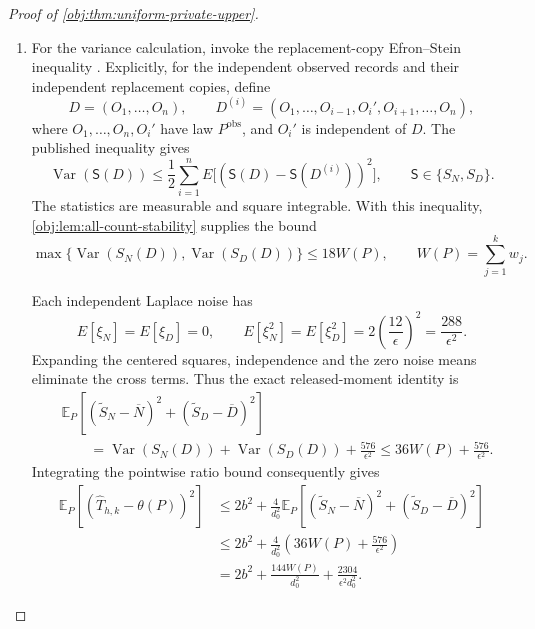 \begin{proof}[Proof of \cref{obj:thm:uniform-private-upper}]
\begin{enumerate}
\item
For the variance calculation, invoke the replacement-copy Efron--Stein inequality \citep[Theorem~3.1, replacement-copy form, p.~54]{BoucheronLugosiMassart2013}. Explicitly, for the independent observed records and their independent replacement copies, define
\[
D=(O_1,\ldots,O_n),
\qquad
D^{(i)}=(O_1,\ldots,O_{i-1},O_i',O_{i+1},\ldots,O_n),
\]
where \(O_1,\ldots,O_n,O_i'\) have law \(P^{\mathrm{obs}}\), and \(O_i'\) is independent of \(D\). The published inequality gives
\[
\operatorname{Var}(\mathsf S(D))
\le
\frac12\sum_{i=1}^n
E\bigl[(\mathsf S(D)-\mathsf S(D^{(i)}))^2\bigr],
\qquad
\mathsf S\in\{S_N,S_D\}.
\]
The statistics are measurable and square integrable. With this inequality, \cref{obj:lem:all-count-stability} supplies the bound
\[
\max\{\operatorname{Var}(S_N(D)),\operatorname{Var}(S_D(D))\}
\le18W(P),
\qquad
W(P)=\sum_{j=1}^k w_j.
\]

Each independent Laplace noise has
\[
E[\xi_N]=E[\xi_D]=0,
\qquad
E[\xi_N^2]=E[\xi_D^2]
=2\left(\frac{12}{\epsilon}\right)^2
=\frac{288}{\epsilon^2}.
\]
Expanding the centered squares, independence and the zero noise means eliminate the cross terms. Thus the exact released-moment identity is
\[
\begin{aligned}
&\mathbb E_P\left[
(\widetilde S_N-\overline N)^2+
(\widetilde S_D-\overline D)^2
\right]\\
&\qquad=
\operatorname{Var}(S_N(D))
+\operatorname{Var}(S_D(D))
+\frac{576}{\epsilon^2}
\le36W(P)+\frac{576}{\epsilon^2}.
\end{aligned}
\]
Integrating the pointwise ratio bound consequently gives
\[
\begin{aligned}
\mathbb E_P[(\widehat T_{h,k}-\theta(P))^2]
&\le
2b^2+\frac4{d_0^2}
\mathbb E_P\left[
(\widetilde S_N-\overline N)^2+
(\widetilde S_D-\overline D)^2
\right]\\
&\le
2b^2+\frac4{d_0^2}
\left(36W(P)+\frac{576}{\epsilon^2}\right)\\
&=
2b^2+\frac{144W(P)}{d_0^2}
+\frac{2304}{\epsilon^2d_0^2}.
\end{aligned}
\]


\end{enumerate}
\end{proof}
